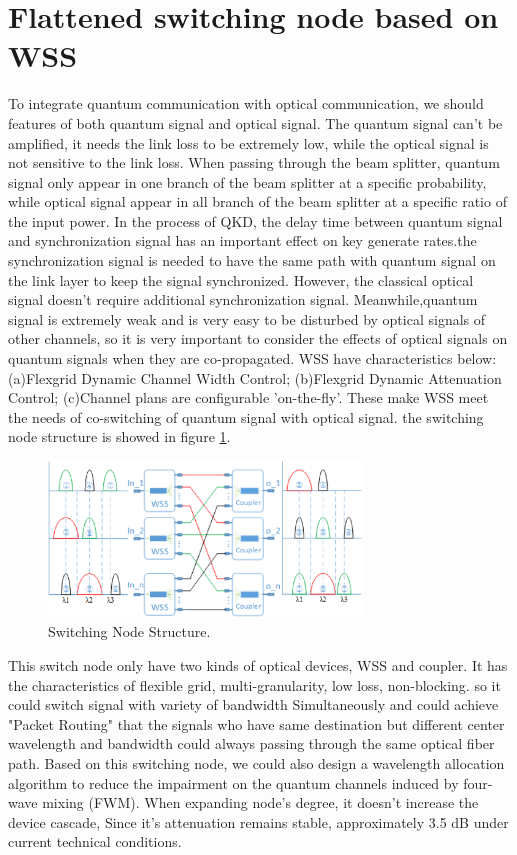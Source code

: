 \documentclass[letterpaper,10pt]{article}
\begin{document}
\section{Flattened switching node based on WSS}

To integrate quantum communication with optical communication, we should features of both quantum signal and optical signal. The quantum signal can't be amplified, it needs the link loss to be extremely low, while the optical signal is not sensitive to the link loss. When passing through the beam splitter, quantum signal only appear in one branch of the beam splitter at a specific probability, while optical signal appear in all branch of the beam splitter at a specific ratio of the input power. In the process of QKD, the delay time between quantum signal and synchronization signal has an important effect on key generate rates.the synchronization signal is needed to have the same path with quantum signal on the link layer to keep the signal synchronized. However, the classical optical signal doesn't require additional synchronization signal. Meanwhile,quantum signal is extremely weak and is very easy to be disturbed by optical signals of other channels, so it is very important to consider the effects of optical signals on quantum signals when they are co-propagated. WSS have characteristics below: (a)Flexgrid Dynamic Channel Width Control; (b)Flexgrid Dynamic Attenuation Control; (c)Channel plans are configurable 'on-the-fly'. These make WSS meet the needs of co-switching of quantum signal with optical signal. the switching node structure is showed in figure \ref{Fig:switching_node_structure}.
\begin{figure}[htbp]
  \centering
  \includegraphics[width=8.3cm]{swtiching_node_struct}
  \caption{Switching Node Structure.} \label{Fig:switching_node_structure}
\end{figure}
This switch node only have two kinds of optical devices, WSS and coupler. It has the characteristics of flexible grid, multi-granularity, low loss, non-blocking. so it could switch signal with variety of bandwidth Simultaneously and could achieve "Packet Routing" that the signals who have same destination but different center wavelength and bandwidth could always passing through the same optical fiber path. Based on this switching node, we could also design a wavelength allocation algorithm to reduce the impairment on the quantum channels induced by four-wave mixing (FWM). When expanding node's degree, it doesn't increase the device cascade, Since it's attenuation remains stable, approximately 3.5 dB under current technical conditions.
\end{document}
